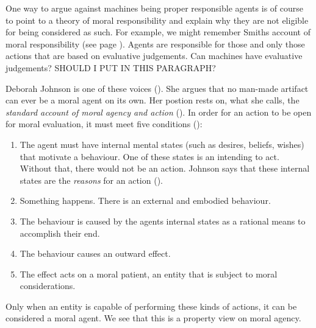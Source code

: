 \documentclass{article}
\newcounter{example}
\begin{document}
One way to argue against machines being proper responsible agents is of course to
point to a theory of moral responsibility and explain why they are not eligible
for being considered as such. For example, we might remember Smiths account of
moral responsibility (see page \pageref{smith}). Agents are responsible for
those and only those actions that are based on evaluative judgements. Can
machines have evaluative judgements?
SHOULD I PUT IN THIS PARAGRAPH?

Deborah Johnson is one of these voices (\cite{johnson2006computer}). She argues
that no man-made artifact can ever be a moral agent on its own. Her postion rests on, what
she calls, the \textit{standard account of moral agency and action} (\cite[p.
198]{johnson2006computer}). In order for an action to be open for moral
evaluation, it must meet five conditions (\cite[p. 198]{johnson2006computer}):

\begin{enumerate}
	\item The agent must have internal mental states (such as desires,
		beliefs, wishes) that motivate a behaviour. One of these states
		is an intending to act. Without that, there would not be an
		action. Johnson says that these internal states are the
		\textit{reasons} for an action (\cite[p. 198]{johnson2006computer}).
	\item Something happens. There is an external and embodied behaviour.
	\item The behaviour is caused by the agents internal states as a
		rational means to accomplish their end.
	\item The behaviour causes an outward effect.
	\item The effect acts on a moral patient, an entity that is subject to
		moral considerations.
\end{enumerate}

Only when an entity is capable of performing these kinds of actions, it can be
considered a moral agent. We see that this is a property view on moral agency.\\
\end{document}

